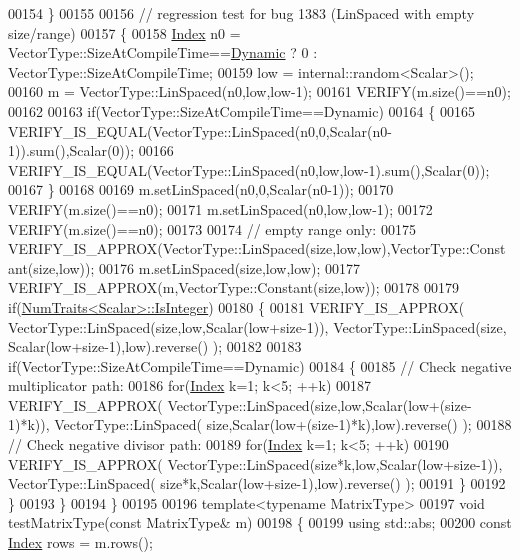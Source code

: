 \begin{DoxyCode}
00154   \}
00155 
00156   \textcolor{comment}{// regression test for bug 1383 (LinSpaced with empty size/range)}
00157   \{
00158     \hyperlink{namespace_eigen_a62e77e0933482dafde8fe197d9a2cfde}{Index} n0 = VectorType::SizeAtCompileTime==\hyperlink{namespace_eigen_ad81fa7195215a0ce30017dfac309f0b2}{Dynamic} ? 0 : VectorType::SizeAtCompileTime;
00159     low = internal::random<Scalar>();
00160     m = VectorType::LinSpaced(n0,low,low-1);
00161     VERIFY(m.size()==n0);
00162 
00163     \textcolor{keywordflow}{if}(VectorType::SizeAtCompileTime==Dynamic)
00164     \{
00165       VERIFY\_IS\_EQUAL(VectorType::LinSpaced(n0,0,Scalar(n0-1)).sum(),Scalar(0));
00166       VERIFY\_IS\_EQUAL(VectorType::LinSpaced(n0,low,low-1).sum(),Scalar(0));
00167     \}
00168 
00169     m.setLinSpaced(n0,0,Scalar(n0-1));
00170     VERIFY(m.size()==n0);
00171     m.setLinSpaced(n0,low,low-1);
00172     VERIFY(m.size()==n0);
00173 
00174     \textcolor{comment}{// empty range only:}
00175     VERIFY\_IS\_APPROX(VectorType::LinSpaced(size,low,low),VectorType::Constant(size,low));
00176     m.setLinSpaced(size,low,low);
00177     VERIFY\_IS\_APPROX(m,VectorType::Constant(size,low));
00178 
00179     \textcolor{keywordflow}{if}(\hyperlink{group___core___module_struct_eigen_1_1_num_traits}{NumTraits<Scalar>::IsInteger})
00180     \{
00181       VERIFY\_IS\_APPROX( VectorType::LinSpaced(size,low,Scalar(low+size-1)), VectorType::LinSpaced(size,
      Scalar(low+size-1),low).reverse() );
00182 
00183       \textcolor{keywordflow}{if}(VectorType::SizeAtCompileTime==Dynamic)
00184       \{
00185         \textcolor{comment}{// Check negative multiplicator path:}
00186         \textcolor{keywordflow}{for}(\hyperlink{namespace_eigen_a62e77e0933482dafde8fe197d9a2cfde}{Index} k=1; k<5; ++k)
00187           VERIFY\_IS\_APPROX( VectorType::LinSpaced(size,low,Scalar(low+(size-1)*k)), VectorType::LinSpaced(
      size,Scalar(low+(size-1)*k),low).reverse() );
00188         \textcolor{comment}{// Check negative divisor path:}
00189         \textcolor{keywordflow}{for}(\hyperlink{namespace_eigen_a62e77e0933482dafde8fe197d9a2cfde}{Index} k=1; k<5; ++k)
00190           VERIFY\_IS\_APPROX( VectorType::LinSpaced(size*k,low,Scalar(low+size-1)), VectorType::LinSpaced(
      size*k,Scalar(low+size-1),low).reverse() );
00191       \}
00192     \}
00193   \}
00194 \}
00195 
00196 \textcolor{keyword}{template}<\textcolor{keyword}{typename} MatrixType>
00197 \textcolor{keywordtype}{void} testMatrixType(\textcolor{keyword}{const} MatrixType& m)
00198 \{
00199   \textcolor{keyword}{using} std::abs;
00200   \textcolor{keyword}{const} \hyperlink{namespace_eigen_a62e77e0933482dafde8fe197d9a2cfde}{Index} rows = m.rows();

\end{DoxyCode}
